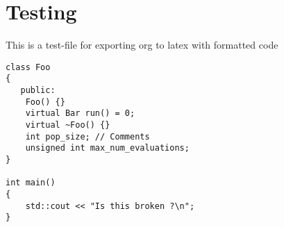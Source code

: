 \documentclass[a4paper,12pt]{article}
\author{Justin Kaipada}
\date{\today}
\title{}
\begin{document}
\section*{Testing}
\label{sec:org998434b}
This is a test-file for exporting org to latex with formatted code

\lstset{language=C++,label= ,caption= ,captionpos=b,numbers=none,language=cpp,numbers=none}
\begin{lstlisting}
class Foo
{
   public:
    Foo() {}
    virtual Bar run() = 0;
    virtual ~Foo() {}
    int pop_size; // Comments
    unsigned int max_num_evaluations;
}

int main()
{
    std::cout << "Is this broken ?\n";
}
\end{lstlisting}
\end{document}
